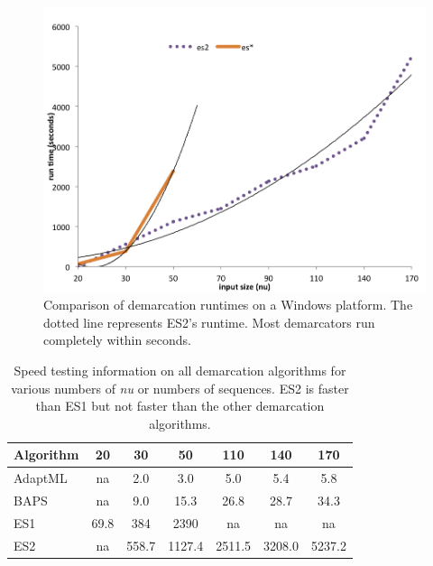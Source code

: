 \begin{figure}[h!]
  \centering
    \includegraphics[scale=0.7]{images/SpeedWindows-CH4}
      \caption[Demarcation run time test on a Windows platform.]{Comparison of demarcation runtimes on a Windows platform. The dotted line represents ES2's runtime. Most demarcators run completely within seconds.}
    \label{fig:WindowsSpeed}
\end{figure}

\begin{table}
\centering
    \begin{tabular}{l|cccccc}
    Algorithm & 20   & 30    & 50     & 110    & 140    & 170    \\ \hline
    AdaptML   & na   & 2.0   & 3.0    & 5.0    & 5.4    & 5.8    \\
    BAPS      & na   & 9.0   & 15.3   & 26.8   & 28.7   & 34.3   \\
    ES1       & 69.8 & 384   & 2390   & na     & na     & na     \\
    ES2       & na   & 558.7 & 1127.4 & 2511.5 & 3208.0 & 5237.2 \\
    \end{tabular}
    \caption[Speed testing information on all demarcation algorithms.]{Speed testing information on all demarcation algorithms for various numbers of \emph{nu} or numbers of sequences. ES2 is faster than ES1 but not faster than the other demarcation algorithms.}
    \label{tab:WindowsSpeed}
\end{table}

